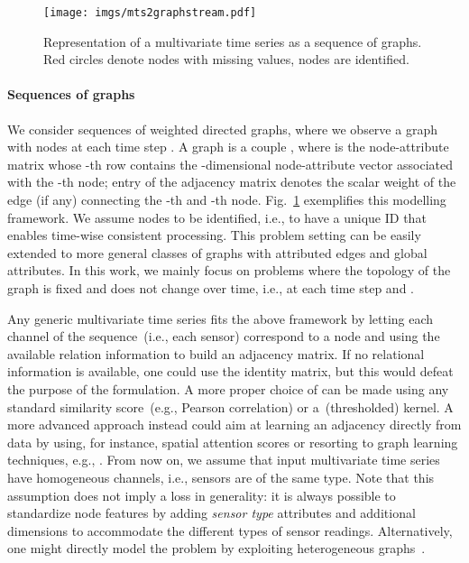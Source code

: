 \documentclass{article} \usepackage{iclr2022_conference,times}
\begin{document}
\begin{figure}
    \centering
    \texttt{[image: imgs/mts2graphstream.pdf]}
    \vspace{-0.6cm}
    \caption{Representation of a multivariate time series as a sequence of graphs. Red circles denote nodes with missing values, nodes are identified.}
    \label{fig:graph_stream}
\end{figure}

\paragraph{Sequences of graphs} We consider sequences of weighted directed graphs, where we observe a graph  with  nodes at each time step . A graph is a couple , where  is the node-attribute matrix whose -th row contains the -dimensional node-attribute vector  associated with the -th node; entry  of the adjacency matrix  denotes the scalar weight of the edge (if any) connecting the -th and -th node. Fig.~\ref{fig:graph_stream} exemplifies this modelling framework. We assume nodes to be identified, i.e., to have a unique ID that enables time-wise consistent processing. This problem setting can be easily extended to more general classes of graphs with attributed edges and global attributes. In this work, we mainly focus on problems where the topology of the graph is fixed and does not change over time, i.e., at each time step  and . 

Any generic multivariate time series fits the above framework by letting each channel of the sequence~(i.e., each sensor) correspond to a node and using the available relation information to build an adjacency matrix. If no relational information is available, one could use the identity matrix, but this would defeat the purpose of the formulation. A more proper choice of  can be made using any standard similarity score~(e.g., Pearson correlation) or a~(thresholded) kernel. A more advanced approach instead could aim at learning an adjacency directly from data by using, for instance, spatial attention scores or resorting to graph learning techniques, e.g., \citet{kipf2018neural}. From now on, we assume that input multivariate time series have homogeneous channels, i.e., sensors are of the same type. Note that this assumption does not imply a loss in generality: it is always possible to standardize node features by adding \textit{sensor type} attributes and additional dimensions to accommodate the different types of sensor readings. Alternatively, one might directly model the problem by exploiting heterogeneous graphs~\citep{schlichtkrull2018modeling}.
\end{document}
